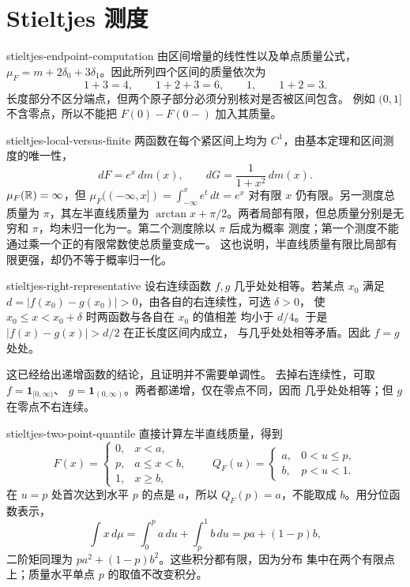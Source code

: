 \chapter{Stieltjes 测度}

\begin{solution}{stieltjes-endpoint-computation}
由区间增量的线性性以及单点质量公式，
\(\mu_F=m+2\delta_0+3\delta_1\)。因此所列四个区间的质量依次为
\[
 1+3=4,\qquad 1+2+3=6,\qquad 1,\qquad 1+2=3.
\]
长度部分不区分端点，但两个原子部分必须分别核对是否被区间包含。
例如 \((0,1]\) 不含零点，所以不能把 \(F(0)-F(0-)\) 加入其质量。
\end{solution}

\begin{solution}{stieltjes-local-versus-finite}
两函数在每个紧区间上均为 \(C^1\)，由基本定理和区间测度的唯一性，
\[
 dF=e^x\,dm(x),\qquad dG=\frac1{1+x^2}\,dm(x).
\]
\(\mu_F(\mathbb{R})=\infty\)，但
\(\mu_F(({-\infty},x])=\int_{-\infty}^xe^t\,dt=e^x\) 对有限 \(x\)
仍有限。另一测度总质量为 \(\pi\)，其左半直线质量为
\(\arctan x+\pi/2\)。两者局部有限，但总质量分别是无穷和
\(\pi\)，均未归一化为一。第二个测度除以 \(\pi\) 后成为概率
测度；第一个测度不能通过乘一个正的有限常数使总质量变成一。
这也说明，半直线质量有限比局部有限更强，却仍不等于概率归一化。
\end{solution}

\begin{solution}{stieltjes-right-representative}
设右连续函数 \(f,g\) 几乎处处相等。若某点 \(x_0\) 满足
\(d=|f(x_0)-g(x_0)|>0\)，由各自的右连续性，可选 \(\delta>0\)，
使 \(x_0\le x<x_0+\delta\) 时两函数与各自在 \(x_0\) 的值相差
均小于 \(d/4\)。于是 \(|f(x)-g(x)|>d/2\) 在正长度区间内成立，
与几乎处处相等矛盾。因此 \(f=g\) 处处。

这已经给出递增函数的结论，且证明并不需要单调性。
去掉右连续性，可取 \(f=\mathbf1_{[0,\infty)}\)、
\(g=\mathbf1_{(0,\infty)}\)。两者都递增，仅在零点不同，因而
几乎处处相等；但 \(g\) 在零点不右连续。
\end{solution}

\begin{solution}{stieltjes-two-point-quantile}
直接计算左半直线质量，得到
\[
 F(x)=\begin{cases}0,&x<a,\\p,&a\le x<b,\\1,&x\ge b,\end{cases}
 \qquad
 Q_F(u)=\begin{cases}a,&0<u\le p,\\b,&p<u<1.\end{cases}
\]
在 \(u=p\) 处首次达到水平 \(p\) 的点是 \(a\)，所以
\(Q_F(p)=a\)，不能取成 \(b\)。用分位函数表示，
\[
 \int x\,d\mu=\int_0^p a\,du+\int_p^1b\,du=pa+(1-p)b,
\]
二阶矩同理为 \(pa^2+(1-p)b^2\)。这些积分都有限，因为分布
集中在两个有限点上；质量水平单点 \(p\) 的取值不改变积分。
\end{solution}

